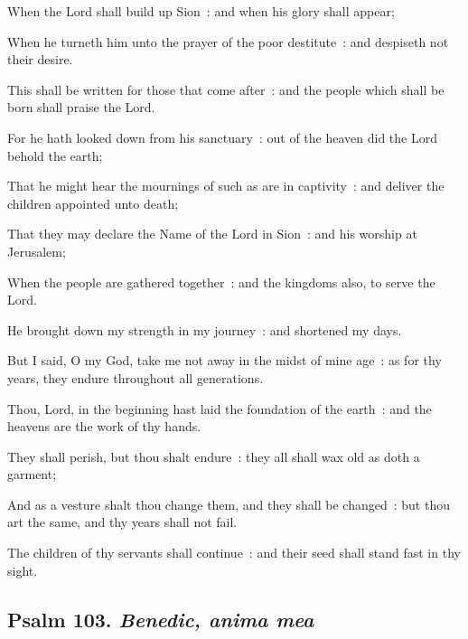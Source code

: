 When the Lord shall build up Sion~: and when his glory shall appear;\par
{}When he turneth him unto the prayer of the poor destitute~: and despiseth not their desire.\par
{}This shall be written for those that come after~: and the people which shall be born shall praise the Lord.\par
{}For he hath looked down from his sanctuary~: out of the heaven did the Lord behold the earth;\par
{}That he might hear the mournings of such as are in captivity~: and deliver the children appointed unto death;\par
{}That they may declare the Name of the Lord in Sion~: and his worship at Jerusalem;\par
{}When the people are gathered together~: and the kingdoms also, to serve the Lord.\par
{}He brought down my strength in my journey~: and shortened my days.\par
{}But I said, O my God, take me not away in the midst of mine age~: as for thy years, they endure throughout all generations.\par
{}Thou, Lord, in the beginning hast laid the foundation of the earth~: and the heavens are the work of thy hands.\par
{}They shall perish, but thou shalt endure~: they all shall wax old as doth a garment;\par
{}And as a vesture shalt thou change them, and they shall be changed~: but thou art the same, and thy years shall not fail.\par
{}The children of thy servants shall continue~: and their seed shall stand fast in thy sight.\par

\subsection{Psalm 103. \textit{Benedic, anima mea}}

